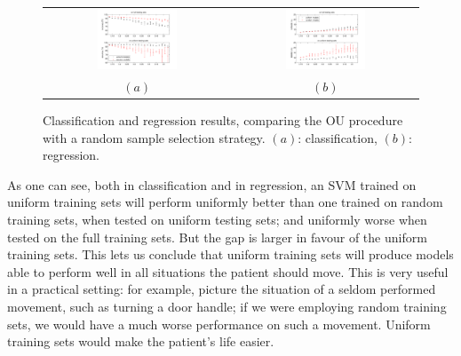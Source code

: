 \begin{figure}[!ht] \centering
  \begin{tabular}{cc}
    \includegraphics[width=0.45\textwidth]{figs/fig_rnVSuni1} &
    \includegraphics[width=0.45\textwidth]{figs/fig_rnVSuni2} \\
    $(a)$ & $(b)$ \\
  \end{tabular}
  \caption{Classification and regression results, comparing the OU
  procedure with a random sample selection strategy. $(a)$:
    classification, $(b)$: regression.}
  \label{fig:rnVSuni}
\end{figure}

As one can see, both in classification and in regression, an SVM
trained on uniform training sets will perform uniformly better than
one trained on random training sets, when tested on uniform testing
sets; and uniformly worse when tested on the full training sets. But
the gap is larger in favour of the uniform training sets. This lets us
conclude that uniform training sets will produce models able to
perform well in all situations the patient should move. This is very
useful in a practical setting: for example, picture the situation of a
seldom performed movement, such as turning a door handle; if we were
employing random training sets, we would have a much worse performance
on such a movement. Uniform training sets would make the patient's
life easier.
